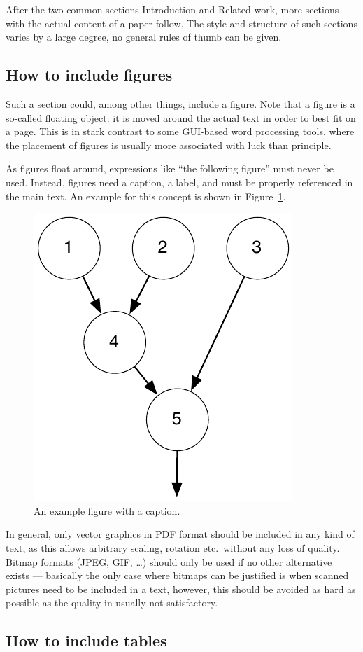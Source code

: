 \documentclass[12pt,twoside]{article}
\begin{document}
After the two common sections Introduction and Related work, more
sections with the actual content of a paper follow. The style and
structure of such sections varies by a large degree, no general rules
of thumb can be given.

\subsection{How to include figures}

Such a section could, among other things, include a figure. Note that
a figure is a so-called floating object: it is moved around the actual
text in order to best fit on a page. This is in stark contrast to some
GUI-based word processing tools, where the placement of figures is
usually more associated with luck than principle.

As figures float around, expressions like ``the following figure''
must never be used. Instead, figures need a caption, a label, and must
be properly referenced in the main text. An example for this concept
is shown in Figure~\ref{fig:example}.

\begin{figure}
	\centering
	\includegraphics[width=0.3\linewidth]{fig/example}
	\caption{An example figure with a caption.}
	\label{fig:example}
\end{figure}

In general, only vector graphics in PDF format should be included in any
kind of text, as this allows arbitrary scaling, rotation etc.\ without any
loss of quality. Bitmap formats
(JPEG, GIF, \dots) should only be used if no other alternative exists
--- basically the only case where bitmaps can be justified is when
scanned pictures need to be included in a text, however, this should
be avoided as hard as possible as the quality in usually not
satisfactory.

\subsection{How to include tables}
\end{document}
